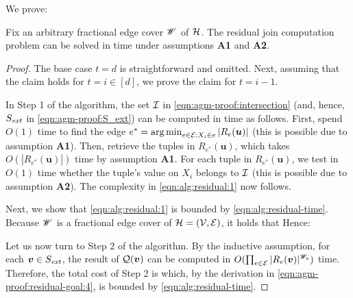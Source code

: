 We prove:

\begin{lemma} \label{lmm:alg:residual}
    Fix an arbitrary fractional edge cover $\mathscr{W}$ of $\mathcal{H}$.
    The residual join computation problem can be solved in time
    under assumptions {\bf A1} and {\bf A2}.
\end{lemma}

\begin{proof}
   The base case $t = d$ is straightforward and omitted. Next, assuming that the claim holds for $t = i \in [d]$, we prove the claim for $t = i - 1$.

   \vgap

   In Step 1 of the algorithm, the set $\mathcal{I}$ in \eqref{eqn:agm-proof:intersection} (and, hence, $S_{\mathit{ext}}$ in \eqref{eqn:agm-proof:S_ext}) can be computed in
   time as follows. First, spend $O(1)$ time to find the edge $e^* = \operatorname*{arg\,min}_{e \in \mathcal{E}: X_i \in e} |R_e(\textrm{\boldmath${u}$})|$ (this is possible due to assumption {\bf A1}). Then, retrieve the tuples in $R_{e^*}(\bm{u})$, which takes $O(|R_{e^*}(\bm{u})|)$ time by assumption {\bf A1}. For each tuple in $R_{e^*}(\bm{u})$, we test in $O(1)$ time whether the tuple's value on $X_i$ belongs to $\mathcal{I}$ (this is possible due to assumption {\bf A2}). The complexity in \eqref{eqn:alg:residual:1} now follows.

   \vgap

   Next, we show that \eqref{eqn:alg:residual:1} is bounded by \eqref{eqn:alg:residual-time}. Because $\mathscr{W}$ is a fractional edge cover of $\mathcal{H} = (\mathcal{V}, \mathcal{E})$, it holds that
    Hence:

    \vslit

    Let us now turn to Step 2 of the algorithm. By the inductive assumption, for each $\textrm{\boldmath${v}$} \in S_{\mathit{ext}}$, the result of $\mathcal{Q}(\textrm{\boldmath${v}$})$ can be computed in $O(\prod_{e \in \mathcal{E}} |R_e(\textrm{\boldmath${v}$})|^{\mathscr{W}_e})$ time. Therefore, the total cost of Step 2 is
    which, by the derivation in \eqref{eqn:agm-proof:residual-goal:4}, is bounded by \eqref{eqn:alg:residual-time}.
\end{proof}

